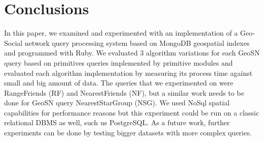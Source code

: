 \documentclass[prodmode,acmtods]{acmsmall} %
\begin{document}
\clearpage{}
\section{Conclusions}
In this paper, we examined and experimented with an implementation of a Geo-Social network 
query processing system based on MongoDB geospatial indexes and programmed with Ruby. 
We evaluated 3 algorithm variations for each GeoSN query based on primitives queries implemented by primitive modules and evaluated each algorithm
implementation by measuring its process time against small and big amount of data. The queries that we experimented on were RangeFriends (RF) and NearestFriends (NF),
but a similar work needs to be done for GeoSN query NearestStarGroup (NSG). We used NoSql spatial capabilities for performance reasons but this experiment could be run on a 
classic relational DBMS as well, such us PostgreSQL. As a future work, further experiments can be done by testing bigger datasets with more complex queries.



%

\end{document}
